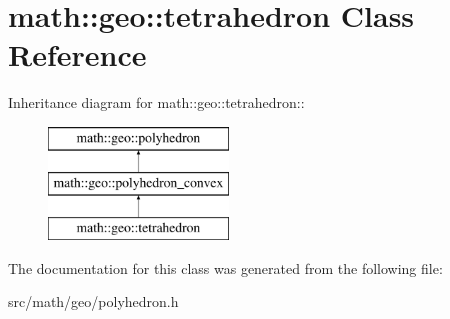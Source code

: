 \hypertarget{classmath_1_1geo_1_1tetrahedron}{
\section{math::geo::tetrahedron Class Reference}
\label{classmath_1_1geo_1_1tetrahedron}
}
Inheritance diagram for math::geo::tetrahedron::\begin{figure}[H]
\begin{center}
\leavevmode
\includegraphics[height=3cm]{classmath_1_1geo_1_1tetrahedron}
\end{center}
\end{figure}


The documentation for this class was generated from the following file:\begin{DoxyCompactItemize}
\item 
src/math/geo/polyhedron.h\end{DoxyCompactItemize}
